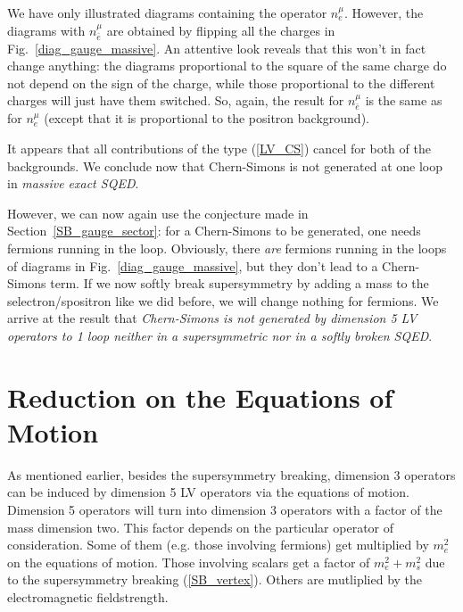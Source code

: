 \documentclass[a4paper,12pt]{article}
\begin{document}
        We have only illustrated diagrams containing the operator 
$ n_e^\mu $.
        However, the diagrams with 
$ n_{\bar{e}}^\mu $
	are obtained by flipping all the charges in 
Fig.~\ref{diag_gauge_massive}.
        An attentive look reveals that this won't in fact change 
	anything: 
	the diagrams proportional to the square of the same charge
	do not depend on the sign of the charge, 
	while those proportional to the different charges will
	just have them switched.
	So, again, the result for 
$ n_{\bar{e}}^\mu $
	is the same as for
$ n_e^\mu $
	(except that it is proportional to the positron background).

	It appears that all contributions of the type
	(\ref{LV_CS}) cancel for both of the backgrounds. 
	We conclude now that Chern-Simons is not generated at one loop
	in {\it massive exact SQED}.

	However, we can now again use the conjecture made
	in Section~\ref{SB_gauge_sector}: for a Chern-Simons to be
	generated, one needs fermions running in the loop. 
	Obviously, there {\it are} fermions running in the loops
	of diagrams in 
Fig.~\ref{diag_gauge_massive}, 
	but they don't lead to a Chern-Simons term.
	If we now softly break supersymmetry by adding a mass
	to the selectron/spositron like we did before, 
	we will change nothing for fermions.
	We arrive at the result that {\it Chern-Simons is not generated
	by dimension 5 LV operators 
	to 1 loop neither in a supersymmetric nor in a softly
	broken SQED}.


\section{Reduction on the Equations of Motion}
\label{Reduction}

	As mentioned earlier, besides the supersymmetry breaking, 
	dimension 3 operators can be induced by dimension 5 LV 
	operators via the equations of motion.
	Dimension 5 operators will turn into dimension 3 operators 
	with a factor of the mass dimension two.
	This factor depends on the particular operator of consideration.
	Some of them (e.g. those involving fermions) 
	get multiplied by $ m_e^2 $ on the equations of motion.
	Those involving scalars get a factor of
	$ m_e^2 + m_s^2 $
	due to the supersymmetry breaking (\ref{SB_vertex}).
	Others are mutliplied by the electromagnetic fieldstrength.
	
\end{document}
